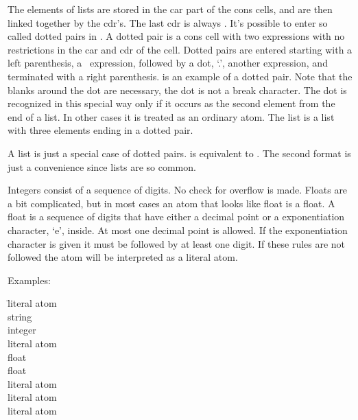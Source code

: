 \begin{examples}
  \ex{(cons 'a (cons 'b (cons 'c]}{(a b c)}
\end{examples}

The elements of lists are stored in the car part of the cons cells,
and are then linked together by the cdr's.  The last cdr is always
\NIL.  It's possible to enter so called dotted pairs in \lips.  A
dotted pair is a cons cell with two expressions with no restrictions
in the car and cdr of the cell.  Dotted pairs are entered starting
with a left parenthesis, a \lips\ expression, followed by a dot, `.',
another expression, and terminated with a right parenthesis.
 is an example of a dotted pair. Note that the blanks
around the dot are necessary, the dot is not a break character.  The
dot is recognized in this special way only if it occurs as the second
element from the end of a list.  In other cases it is treated as an
ordinary atom.  The list  is a list with three
elements ending in a dotted pair.

A list is just a special case of dotted pairs.   is equivalent to .  The second format is just
a convenience since lists are so common.

Integers consist of a sequence of digits.  No check for overflow is
made.  Floats are a bit complicated, but in most cases an atom that
looks like float is a float.  A float is a sequence of digits that
have either a decimal point or a exponentiation character, `e',
inside.  At most one decimal point is allowed.  If the exponentiation
character is given it must be followed by at least one digit.  If
these rules are not followed the atom will be interpreted as a literal
atom.

Examples:
\begin{tabbing}
\hspace*{1cm}\=literal atom\\
      \>string\\
        \>integer\\
        \>literal atom\\
        \>float\\
        \>float\\
         \>literal atom\\
        \>literal atom\\
       \>literal atom
\end{tabbing}

